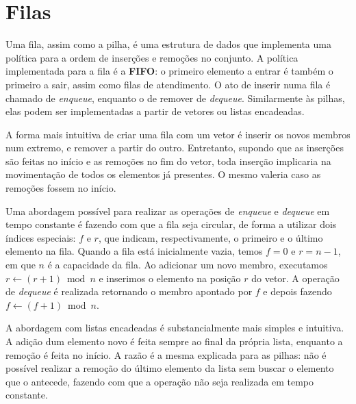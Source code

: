 \section{Filas}

Uma fila, assim como a pilha, é uma estrutura de dados que implementa uma política para
a ordem de inserções e remoções no conjunto.
A política implementada para a fila é a \textbf{FIFO}: o primeiro elemento a entrar
é também o primeiro a sair, assim como filas de atendimento.
O ato de inserir numa fila é chamado de \textit{enqueue}, enquanto o de remover de
\textit{dequeue}.
Similarmente às pilhas, elas podem ser implementadas a partir de vetores ou listas
encadeadas.

A forma mais intuitiva de criar uma fila com um vetor é inserir os novos membros
num extremo, e remover a partir do outro.
Entretanto, supondo que as inserções são feitas no início e as remoções no fim do vetor,
toda inserção implicaria na movimentação de todos os elementos já presentes.
O mesmo valeria caso as remoções fossem no início.

Uma abordagem possível para realizar as operações de \textit{enqueue} e \textit{dequeue}
em tempo constante é fazendo com que a fila seja circular, de forma a utilizar dois
índices especiais: $f$ e $r$, que indicam, respectivamente, o primeiro e o último elemento
na fila.
Quando a fila está inicialmente vazia, temos $f=0$ e $r = n-1$, em que $n$ é a capacidade
da fila.
Ao adicionar um novo membro, executamos $r \gets (r+1)\bmod n$ e inserimos o elemento
na posição $r$ do vetor.
A operação de \textit{dequeue} é realizada retornando o membro apontado por $f$ e depois
fazendo $f \gets (f + 1) \bmod n$.

\begin{algorithm}
\SetAlgoLined
{}

\end{algorithm}

A abordagem com listas encadeadas é substancialmente mais simples e intuitiva.
A adição dum elemento novo é feita sempre ao final da própria lista, enquanto
a remoção é feita no início.
A razão é a mesma explicada para as pilhas: não é possível realizar a remoção
do último elemento da lista sem buscar o elemento que o antecede, fazendo com que
a operação não seja realizada em tempo constante.

\begin{algorithm}
\SetAlgoLined
{}

\end{algorithm}
